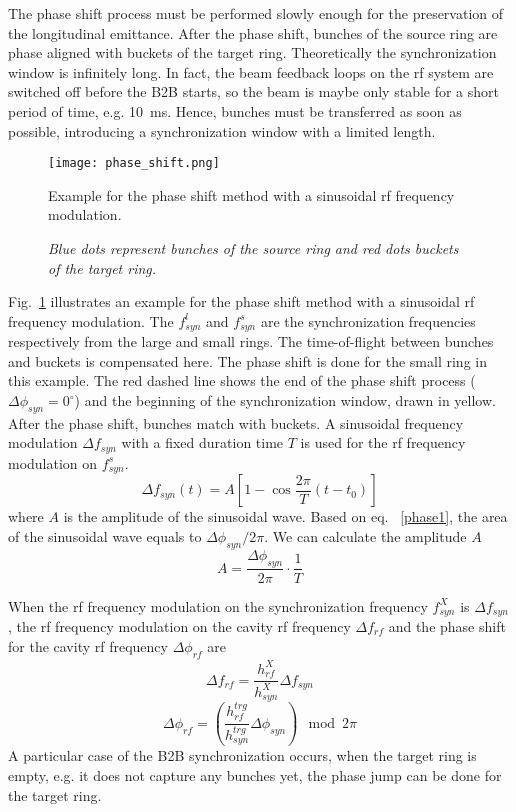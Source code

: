 The phase shift process must be performed slowly enough for the preservation of the longitudinal emittance. After the phase shift, bunches of the source ring are phase aligned with buckets of the target ring. Theoretically the synchronization window is infinitely long. In fact, the beam feedback loops on the rf system are switched off before the B2B starts, so the beam is maybe only stable for a short period of time, e.g. \SI{10}{ms}. Hence, bunches must be transferred as soon as possible, introducing a synchronization window with a limited length.
\begin{figure}[!htb]
   \centering   
   \texttt{[image: phase\_shift.png]}
   \caption{Example for the phase shift method with a sinusoidal rf frequency modulation.}
	\caption*{\textsl{\small{Blue dots represent bunches of the source ring and red dots buckets of the target ring.}}}
   \label{phase_shift}
\end{figure}


Fig.~\ref{phase_shift} illustrates an example for the phase shift method with a sinusoidal rf frequency modulation. The $f_{\mathit{syn}}^{l}$ and $f_{\mathit{syn}}^{s}$ are the synchronization frequencies respectively from the large and small rings. The time-of-flight between bunches and buckets is compensated here. The phase shift is done for the small ring in this example. The red dashed line shows the end of the phase shift process ($\Delta \phi_\mathit{syn}=0^\circ$) and the beginning of the synchronization window, drawn in yellow. After the phase shift, bunches match with buckets. A sinusoidal frequency modulation $\Delta f_{\mathit{syn}}$ with a fixed duration time $T$ is used for the rf frequency modulation on $f_{\mathit{syn}}^{s}$.
\begin{equation}
\Delta f_{\mathit{syn}}(t)=A[1-\cos \frac{2\pi}{T}(t-t_0)]
\end{equation}
where $A$ is the amplitude of the sinusoidal wave. Based on eq. ~\ref{phase1}, the area of the sinusoidal wave equals to $\Delta \phi_\mathit{syn}/2\pi$. We can calculate the amplitude $A$  
\begin{equation}
A= \frac{\Delta \phi_\mathit{syn}}{2\pi}\cdot\frac{1}{T}
\end{equation}

When the rf frequency modulation on the synchronization frequency $f_{\mathit{syn}}^{X}$ is $\Delta f_{\mathit{syn}}$, the rf frequency modulation on the cavity rf frequency $\Delta f_{\mathit{rf}}$ and the phase shift for the cavity rf frequency $\Delta \phi_\mathit{rf}$ are
\begin{equation}
\Delta f_{\mathit{rf}}=\frac{h_\mathit{rf}^\mathit{X}}{h_\mathit{syn}^\mathit{X}}\Delta f_{\mathit{syn}}
\end{equation}
\begin{equation}
\Delta \phi_\mathit{rf}=(\frac{h_\mathit{rf}^\mathit{trg}}{h_\mathit{syn}^\mathit{trg}}\Delta\phi_\mathit{syn}) \mod 2\pi
\end{equation} 
A particular case of the B2B synchronization occurs, when the target ring is empty, e.g. it does not capture any bunches yet, the phase jump can be done for the target ring.

